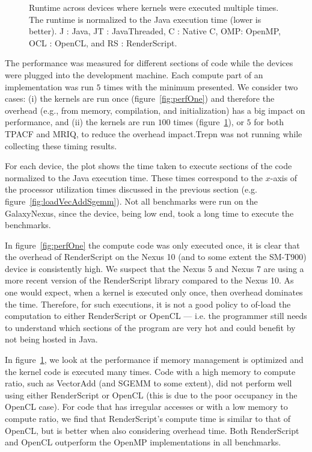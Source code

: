 \begin{figure}
  \caption{Runtime across devices where kernels were executed multiple times. The runtime is normalized to the Java execution time (lower is better). J : Java, JT : JavaThreaded, C : Native C, OMP: OpenMP, OCL : OpenCL, and RS : RenderScript.}
  \label{fig:perfMany}
\end{figure}


The performance was measured for different sections of code while the devices were plugged into the development machine.
Each compute part of an implementation was run $5$ times with the minimum
  presented.
We consider two cases: (i) the kernels are run once (figure~\ref{fig:perfOne}) and therefore
  the overhead (e.g., from memory, compilation, and initialization) has a big impact on performance,
  and (ii) the kernels are run $100$ times (figure~\ref{fig:perfMany}), or $5$ for both TPACF and MRIQ,
  to reduce the overhead impact.Trepn was not running while collecting these timing results.


For each device, the plot shows the time taken to execute sections of the code normalized
  to the Java execution time.
These times correspond to the $x$-axis of the processor utilization times discussed
  in the previous section (e.g. figure~\ref{fig:loadVecAddSgemm}).
Not all benchmarks were run on the GalaxyNexus, since the device,
  being low end, took a long time to execute the benchmarks.

In figure~\ref{fig:perfOne} the compute code was only executed once, it is clear that 
  the overhead of RenderScript on the Nexus 10 (and to some extent the SM-T900) device is consistently high.
We suspect that the Nexus 5 and Nexus 7 are using a more recent version of the RenderScript library compared to the Nexus 10.
As one would expect, when a kernel is executed only once, then overhead dominates the time. Therefore, for such executions, it is not a good policy to of-load the computation to either RenderScript or OpenCL ---
  i.e. the programmer still needs to understand which sections of the program are very hot and could benefit by not being hosted 
  in Java.

In figure~\ref{fig:perfMany}, we look at the performance if memory management is optimized and the kernel code is executed 
  many times.
Code with a high memory to compute ratio, such as VectorAdd (and SGEMM to some extent), did not perform well using either
  RenderScript or OpenCL (this is due to the poor occupancy in the OpenCL case).
For code that has irregular accesses or with a low memory to compute ratio, we find that RenderScript's compute time is similar
  to that of OpenCL, but is better when also considering overhead time.
Both RenderScript and OpenCL outperform the OpenMP implementations in all benchmarks.

